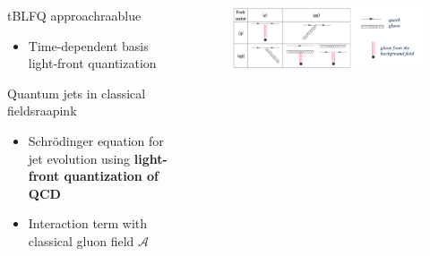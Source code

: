 \documentclass[aspectratio=169,11pt,usenames,dvipsnames]{beamer}
\begin{document}
\begin{frame}
\begin{center}
\begin{columns}[onlytextwidth,t]
            \begin{center}
                \begin{custombox2}{\normalsize tBLFQ approach}{raablue}
                    \small
                    \begin{varwidth}{0.91\textwidth}
                    \begin{itemize}\itemsep0em 
                        \itemsep0em
                        \footnotesize
                        \item Time-dependent basis light-front quantization
                    \end{itemize}
                    \end{varwidth}
                \end{custombox2}
                \begin{custombox2}{\normalsize Quantum jets in classical fields}{raapink}
                    \small
                    \begin{varwidth}{0.91\textwidth}
                    \begin{itemize}\itemsep0em 
                        \itemsep0em
                        \footnotesize
                        \item Schr\"{o}dinger equation for jet evolution using {\bfseries\color{raapink} light-front quantization of QCD}
                        \item Interaction term with classical gluon field $\mathcal{A}$
                    \end{itemize}
                    \end{varwidth}
                \end{custombox2}
            \end{center}
            \vspace{-10pt}
            \begin{figure}
                \centering
                \includegraphics[width=0.95\columnwidth]{images/tblfq_sectors.png}

\end{figure}
\end{columns}
\end{center}
\end{frame}
\end{document}
